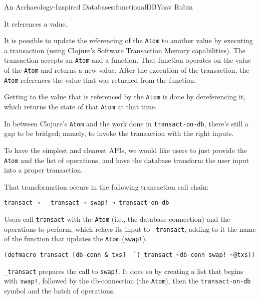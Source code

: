 \begin{aosachapter}{An Archaeology-Inspired Database}{s:functionalDB}{Yoav Rubin}
\begin{aosaenumerate}
\item
  It references a value.
\item
  It is possible to update the referencing of the \texttt{Atom} to
  another value by executing a transaction (using Clojure's Software
  Transaction Memory capabilities). The transaction accepts an
  \texttt{Atom} and a function. That function operates on the value of
  the \texttt{Atom} and returns a new value. After the execution of the
  transaction, the \texttt{Atom} references the value that was returned
  from the function.
\item
  Getting to the value that is referenced by the \texttt{Atom} is done
  by dereferencing it, which returns the state of that \texttt{Atom} at
  that time.
\end{aosaenumerate}

In between Clojure's \texttt{Atom} and the work done in
\texttt{transact-on-db}, there's still a gap to be bridged; namely, to
invoke the transaction with the right inputs.

To have the simplest and clearest APIs, we would like users to just
provide the \texttt{Atom} and the list of operations, and have the
database transform the user input into a proper transaction.

That transformation occurs in the following transaction call chain:

\begin{verbatim}
transact →  _transact → swap! → transact-on-db
\end{verbatim}

\begin{aosaitemize}
\item
  Users call \texttt{transact} with the \texttt{Atom} (i.e., the
  database connection) and the operations to perform, which relays its
  input to \texttt{\_transact}, adding to it the name of the function
  that updates the \texttt{Atom} (\texttt{swap!}).

\begin{verbatim}
(defmacro transact [db-conn & txs]  `(_transact ~db-conn swap! ~@txs))
\end{verbatim}
\item
  \texttt{\_transact} prepares the call to \texttt{swap!}. It does so by
  creating a list that begins with \texttt{swap!}, followed by the
  db-connection (the \texttt{Atom}), then the \texttt{transact-on-db}
  symbol and the batch of operations.


\end{aosaitemize}
\end{aosachapter}
